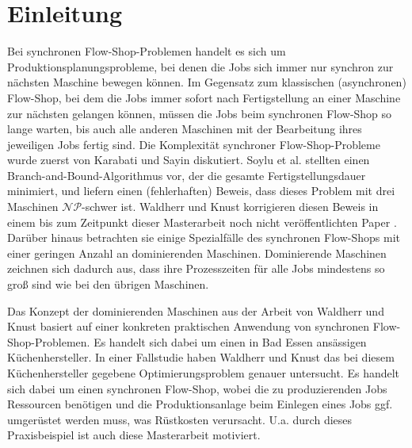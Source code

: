 \documentclass{scrreprt}
\begin{document}
\chapter{Einleitung}
Bei synchronen Flow-Shop-Problemen handelt es sich um Produktions\-planungs\-probleme,
bei denen die Jobs sich immer nur synchron zur nächsten Maschine bewegen können.
Im Gegensatz zum klassischen (asynchronen) Flow-Shop, bei dem die Jobs immer sofort nach Fertigstellung an einer Maschine zur nächsten gelangen können,
müssen die Jobs beim synchronen Flow-Shop so lange warten, bis auch alle anderen Maschinen mit der Bearbeitung ihres jeweiligen Jobs fertig sind.
Die Komplexität synchroner Flow-Shop-Probleme wurde zuerst von Karabati und Sayin \cite{karabati} diskutiert.
Soylu et al. \cite{soylu} stellten einen Branch-and-Bound-Algorithmus vor, der die gesamte Fertigstellungsdauer minimiert, und liefern einen (fehlerhaften) Beweis, 
dass dieses Problem mit drei Maschinen $\mathcal{NP}$-schwer ist.
Waldherr und Knust korrigieren diesen Beweis in einem bis zum Zeitpunkt dieser Masterarbeit noch nicht veröffentlichten Paper \cite{preprint}.
Darüber hinaus betrachten sie einige Spezialfälle des synchronen Flow-Shops mit einer geringen Anzahl an dominierenden Maschinen.
Dominierende Maschinen zeichnen sich dadurch aus, dass ihre Prozesszeiten für alle Jobs mindestens so groß sind wie bei den übrigen Maschinen.

Das Konzept der dominierenden Maschinen aus der Arbeit von Waldherr und Knust basiert auf einer konkreten praktischen Anwendung von synchronen Flow-Shop-Pro\-ble\-men.
Es handelt sich dabei um einen in Bad Essen ansässigen Küchenhersteller.
In einer Fallstudie \cite{casestudy} haben Waldherr und Knust das bei diesem Küchenhersteller gegebene Optimierungsproblem genauer untersucht.
Es handelt sich dabei um einen synchronen Flow-Shop, wobei die zu produzierenden Jobs Ressourcen benötigen und die Produktionsanlage beim Einlegen eines Jobs
ggf. umgerüstet werden muss, was Rüstkosten verursacht.
U.a. durch dieses Praxisbeispiel ist auch diese Masterarbeit motiviert.
\end{document}
